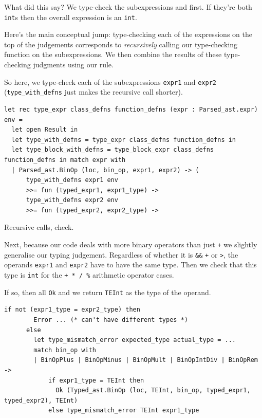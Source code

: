 {{What did this say? We type-check the subexpressions
{{}} and
{{}} first.
If they're both \texttt{int}s then the overall expression is an
\texttt{int}.

Here's the main conceptual jump: type-checking each of the expressions
on the top of the judgements corresponds to \emph{recursively} calling
our type-checking function on the subexpressions. We then combine the
results of these type-checking judgments using our rule.

So here, we type-check each of the subexpressions \texttt{expr1} and
\texttt{expr2} (\texttt{type\_with\_defns} just makes the recursive call
shorter).

\begin{lstlisting}[language=caml]
let rec type_expr class_defns function_defns (expr : Parsed_ast.expr) env =
  let open Result in
  let type_with_defns = type_expr class_defns function_defns in
  let type_block_with_defns = type_block_expr class_defns function_defns in match expr with
  | Parsed_ast.BinOp (loc, bin_op, expr1, expr2) -> (
      type_with_defns expr1 env
      >>= fun (typed_expr1, expr1_type) ->
      type_with_defns expr2 env
      >>= fun (typed_expr2, expr2_type) ->
\end{lstlisting}

Recursive calls, check.

Next, because our code deals with more binary operators than just
\texttt{+} we slightly generalise our typing judgement. Regardless of
whether it is \texttt{\&\&} \texttt{+} or \texttt{\textgreater{}}, the
operands \texttt{expr1} and \texttt{expr2} have to have the same type.
Then we check that this type is \texttt{int} for the
\texttt{+\ *\ /\ \%} arithmetic operator cases.

If so, then all \texttt{Ok} and we return \texttt{TEInt} as the type of
the operand.

\begin{lstlisting}[language=caml]
if not (expr1_type = expr2_type) then
        Error ... (* can't have different types *)
      else
        let type_mismatch_error expected_type actual_type = ...
        match bin_op with
        | BinOpPlus | BinOpMinus | BinOpMult | BinOpIntDiv | BinOpRem ->
            if expr1_type = TEInt then
              Ok (Typed_ast.BinOp (loc, TEInt, bin_op, typed_expr1, typed_expr2), TEInt)
            else type_mismatch_error TEInt expr1_type
\end{lstlisting}

}}
